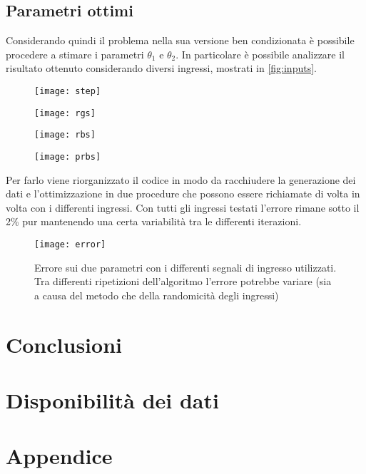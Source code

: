 \subsection{Parametri ottimi}

Considerando quindi il problema nella sua versione ben condizionata è possibile procedere a stimare i parametri $\theta_1$ e $\theta_2$. 
In particolare è possibile analizzare il risultato ottenuto considerando diversi ingressi, mostrati in \cref{fig:inputs}.

\begin{figure*}
\begin{subfigure}{0.25\linewidth}
	\texttt{[image: step]}
	\caption{}
\end{subfigure}\hfill
	\begin{subfigure}{0.25\linewidth}
	\texttt{[image: rgs]}
	\caption{}
\end{subfigure}\hfill
	\begin{subfigure}{0.25\linewidth}
	\texttt{[image: rbs]}
	\caption{}
\end{subfigure}\hfill
	\begin{subfigure}{0.25\linewidth}
	\texttt{[image: prbs]}
	\caption{}
\end{subfigure}\hfill
	\caption{Differenti ingressi utilizzati per stimolare il sistema RLC. Ingresso a gradino (a); ingresso di tipo binario random (b); segnale gaussiano random (c); segnale binario pseudorandomico (d). I segnali sono stati generati tramite il comando \texttt{idinput()} appositamente per l'identificazione di sistemi \cite{idinput}.}
	\label{fig:inputs}
\end{figure*}

Per farlo viene riorganizzato il codice in modo da racchiudere la generazione dei dati e l'ottimizzazione in due procedure che possono essere richiamate di volta in volta con i differenti ingressi. Con tutti gli ingressi testati l'errore rimane sotto il 2\% pur mantenendo una certa variabilità tra le differenti iterazioni. 

\begin{figure}
	\centering
	\texttt{[image: error]}
	\caption{Errore sui due parametri con i differenti segnali di ingresso utilizzati. Tra differenti ripetizioni dell'algoritmo l'errore potrebbe variare (sia a causa del metodo che della randomicità degli ingressi)}
\end{figure}
\section{Conclusioni}
\textcolor{blue}{\lipsum[1-2]}

\section*{Disponibilità dei dati}


\printbibliography[title=Riferimenti]
\pagebreak
\appendix
\section*{Appendice}
\lipsum[1-5]